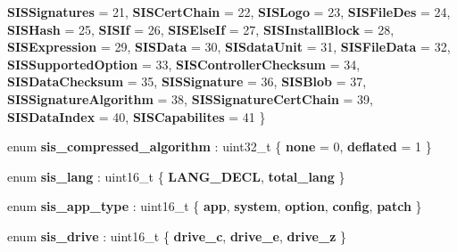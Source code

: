 \begin{DoxyCompactItemize}
\newline
{\bfseries S\+I\+S\+Signatures} = 21, 
{\bfseries S\+I\+S\+Cert\+Chain} = 22, 
{\bfseries S\+I\+S\+Logo} = 23, 
{\bfseries S\+I\+S\+File\+Des} = 24, 
\newline
{\bfseries S\+I\+S\+Hash} = 25, 
{\bfseries S\+I\+S\+If} = 26, 
{\bfseries S\+I\+S\+Else\+If} = 27, 
{\bfseries S\+I\+S\+Install\+Block} = 28, 
\newline
{\bfseries S\+I\+S\+Expression} = 29, 
{\bfseries S\+I\+S\+Data} = 30, 
{\bfseries S\+I\+Sdata\+Unit} = 31, 
{\bfseries S\+I\+S\+File\+Data} = 32, 
\newline
{\bfseries S\+I\+S\+Supported\+Option} = 33, 
{\bfseries S\+I\+S\+Controller\+Checksum} = 34, 
{\bfseries S\+I\+S\+Data\+Checksum} = 35, 
{\bfseries S\+I\+S\+Signature} = 36, 
\newline
{\bfseries S\+I\+S\+Blob} = 37, 
{\bfseries S\+I\+S\+Signature\+Algorithm} = 38, 
{\bfseries S\+I\+S\+Signature\+Cert\+Chain} = 39, 
{\bfseries S\+I\+S\+Data\+Index} = 40, 
\newline
{\bfseries S\+I\+S\+Capabilites} = 41
 \}
\item 
\mbox{\label{namespaceeka2l1_1_1loader_a84975480a785e3fe8af68953bbfbc773}} 
enum {\bfseries sis\+\_\+compressed\+\_\+algorithm} \+: uint32\+\_\+t \{ {\bfseries none} = 0, 
{\bfseries deflated} = 1
 \}
\item 
\mbox{\label{namespaceeka2l1_1_1loader_a35877e250c68560b26f4c9bf534712fa}} 
enum {\bfseries sis\+\_\+lang} \+: uint16\+\_\+t \{ {\bfseries L\+A\+N\+G\+\_\+\+D\+E\+CL}, 
{\bfseries total\+\_\+lang}
 \}
\item 
\mbox{\label{namespaceeka2l1_1_1loader_a9df8aafe6fa945b35999eccdca6e9e05}} 
enum {\bfseries sis\+\_\+app\+\_\+type} \+: uint16\+\_\+t \{ \newline
{\bfseries app}, 
{\bfseries system}, 
{\bfseries option}, 
{\bfseries config}, 
\newline
{\bfseries patch}
 \}
\item 
\mbox{\label{namespaceeka2l1_1_1loader_a0397186e3067bc4a1237e35d850d1339}} 
enum {\bfseries sis\+\_\+drive} \+: uint16\+\_\+t \{ {\bfseries drive\+\_\+c}, 
{\bfseries drive\+\_\+e}, 
{\bfseries drive\+\_\+z}
 \}
\item 

\end{DoxyCompactItemize}
